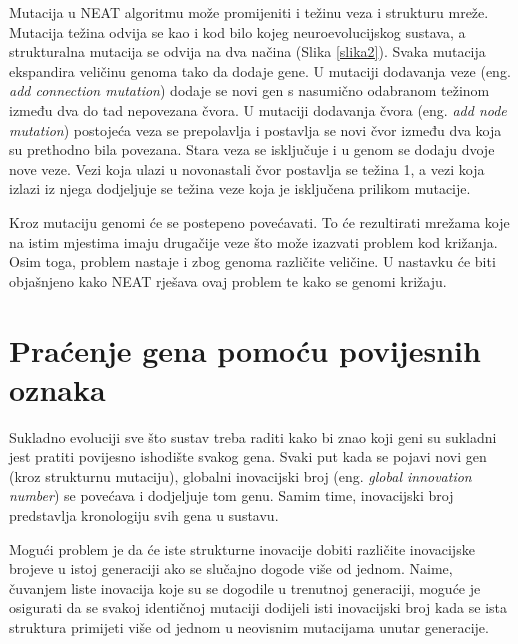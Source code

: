 \documentclass[times, utf8, seminar, numeric]{fer}
\begin{document}
Mutacija u NEAT algoritmu može promijeniti i težinu veza i strukturu mreže. Mutacija težina odvija se kao i kod bilo kojeg neuroevolucijskog sustava, a strukturalna mutacija se odvija na dva načina (Slika \ref{slika2}). Svaka mutacija ekspandira veličinu genoma tako da dodaje gene. U mutaciji dodavanja veze (eng. \textit{add connection mutation}) dodaje se novi gen s nasumično odabranom težinom između dva do tad nepovezana čvora. U mutaciji dodavanja čvora (eng. \textit{add node mutation}) postojeća veza se prepolavlja i postavlja se novi čvor između dva koja su prethodno bila povezana. Stara veza se isključuje i u genom se dodaju dvoje nove veze. Vezi koja ulazi u novonastali čvor postavlja se težina 1, a vezi koja izlazi iz njega dodjeljuje se težina veze koja je isključena prilikom mutacije.

Kroz mutaciju genomi će se postepeno povećavati. To će rezultirati mrežama koje na istim mjestima imaju drugačije veze što može izazvati problem kod križanja. Osim toga, problem nastaje i zbog genoma različite veličine. U nastavku će biti objašnjeno kako NEAT rješava ovaj problem te kako se genomi križaju.

\section{Praćenje gena pomoću povijesnih oznaka}
Sukladno evoluciji sve što sustav treba raditi kako bi znao koji geni su sukladni jest pratiti povijesno ishodište svakog gena. Svaki put kada se pojavi novi gen (kroz strukturnu mutaciju), globalni inovacijski broj (eng. \textit{global innovation number}) se povećava i dodjeljuje tom genu. Samim time, inovacijski broj predstavlja kronologiju svih gena u sustavu.

Mogući problem je da će iste strukturne inovacije dobiti različite inovacijske brojeve u istoj generaciji ako se slučajno dogode više od jednom. Naime, čuvanjem liste inovacija koje su se dogodile u trenutnoj generaciji, moguće je osigurati da se svakoj identičnoj mutaciji dodijeli isti inovacijski broj kada se ista struktura primijeti više od jednom u neovisnim mutacijama unutar generacije.
\end{document}

